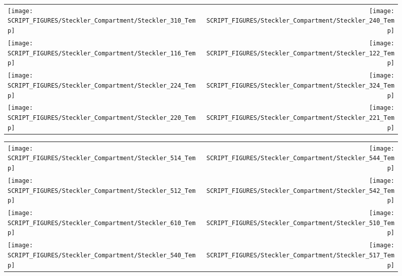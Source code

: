 \begin{figure}[!ht]
\begin{tabular*}{\textwidth}{l@{\extracolsep{\fill}}r}
\texttt{[image: SCRIPT\_FIGURES/Steckler\_Compartment/Steckler\_310\_Temp]} &
\texttt{[image: SCRIPT\_FIGURES/Steckler\_Compartment/Steckler\_240\_Temp]} \\
\texttt{[image: SCRIPT\_FIGURES/Steckler\_Compartment/Steckler\_116\_Temp]} &
\texttt{[image: SCRIPT\_FIGURES/Steckler\_Compartment/Steckler\_122\_Temp]} \\
\texttt{[image: SCRIPT\_FIGURES/Steckler\_Compartment/Steckler\_224\_Temp]} &
\texttt{[image: SCRIPT\_FIGURES/Steckler\_Compartment/Steckler\_324\_Temp]} \\
\texttt{[image: SCRIPT\_FIGURES/Steckler\_Compartment/Steckler\_220\_Temp]} &
\texttt{[image: SCRIPT\_FIGURES/Steckler\_Compartment/Steckler\_221\_Temp]}
\end{tabular*}
\label{Steckler_Temp_4}
\end{figure}

\begin{figure}[!ht]
\begin{tabular*}{\textwidth}{l@{\extracolsep{\fill}}r}
\texttt{[image: SCRIPT\_FIGURES/Steckler\_Compartment/Steckler\_514\_Temp]} &
\texttt{[image: SCRIPT\_FIGURES/Steckler\_Compartment/Steckler\_544\_Temp]} \\
\texttt{[image: SCRIPT\_FIGURES/Steckler\_Compartment/Steckler\_512\_Temp]} &
\texttt{[image: SCRIPT\_FIGURES/Steckler\_Compartment/Steckler\_542\_Temp]} \\
\texttt{[image: SCRIPT\_FIGURES/Steckler\_Compartment/Steckler\_610\_Temp]} &
\texttt{[image: SCRIPT\_FIGURES/Steckler\_Compartment/Steckler\_510\_Temp]} \\
\texttt{[image: SCRIPT\_FIGURES/Steckler\_Compartment/Steckler\_540\_Temp]} &
\texttt{[image: SCRIPT\_FIGURES/Steckler\_Compartment/Steckler\_517\_Temp]}
\end{tabular*}
\label{Steckler_Temp_5}
\end{figure}

